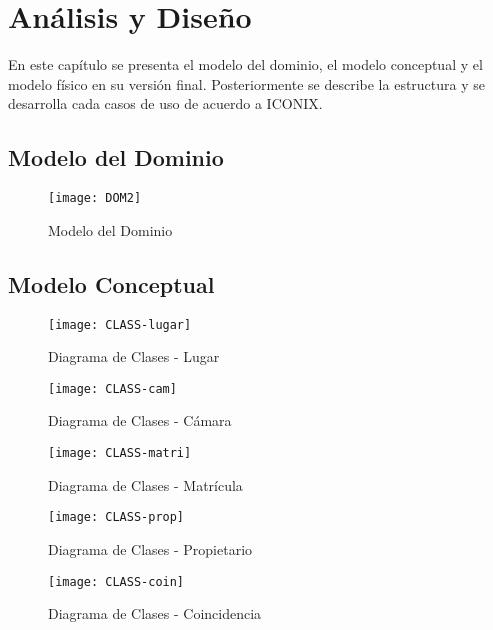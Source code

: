 \chapter{Análisis y Diseño}
En este capítulo se presenta el modelo del dominio, el modelo conceptual y el modelo físico en su versión final. Posteriormente se describe la estructura y se desarrolla cada casos de uso de acuerdo a ICONIX.

\pagebreak
\section{Modelo del Dominio}
    \begin{figure}[H]
        \centering
        \texttt{[image: DOM2]}
        \caption{Modelo del Dominio}
        \label{fig:class-lugar}
    \end{figure}
\section{Modelo Conceptual}

 \begin{figure}[H]
        \centering
        \texttt{[image: CLASS-lugar]}
        \caption{Diagrama de Clases - Lugar}
        \label{fig:class-lugar}
    \end{figure}
 \begin{figure}[H]
        \centering
        \texttt{[image: CLASS-cam]}
        \caption{Diagrama de Clases - Cámara}
        \label{fig:class-camara}
    \end{figure}
 \begin{figure}[H]
        \centering
        \texttt{[image: CLASS-matri]}
        \caption{Diagrama de Clases - Matrícula}
        \label{fig:class-matricula}
    \end{figure}

 \begin{figure}[H]
        \centering
        \texttt{[image: CLASS-prop]}
        \caption{Diagrama de Clases - Propietario}
        \label{fig:class-propietario}
    \end{figure}
    
     \begin{figure}[H]
        \centering
        \texttt{[image: CLASS-coin]}
        \caption{Diagrama de Clases - Coincidencia}
        \label{fig:class-coincidencia}
    \end{figure}

